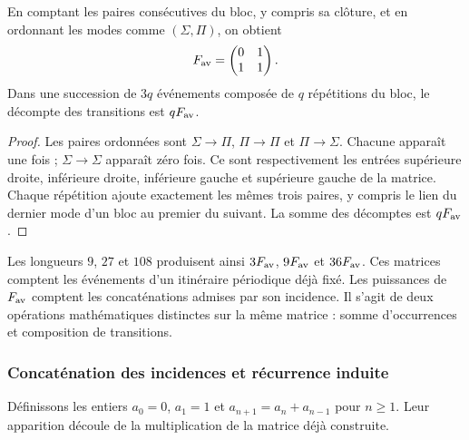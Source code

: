 \begin{proposicion}
\label{prop:cal-incidencia}
En comptant les paires consécutives du bloc, y compris sa clôture, et en ordonnant
les modes comme $(\Sigma,\Pi)$, on obtient
\begin{equation}
 F_{\rm av}=\begin{pmatrix}0&1\\1&1\end{pmatrix}.
 \label{eq:cal-incidencia}
\end{equation}
Dans une succession de $3q$ événements composée de $q$ répétitions du bloc,
le décompte des transitions est $qF_{\rm av}$.
\end{proposicion}
\begin{proof}
Les paires ordonnées sont $\Sigma\to\Pi$, $\Pi\to\Pi$ et
$\Pi\to\Sigma$. Chacune apparaît une fois ; $\Sigma\to\Sigma$
apparaît zéro fois. Ce sont respectivement les entrées supérieure
droite, inférieure droite, inférieure gauche et supérieure gauche de la
matrice. Chaque répétition ajoute exactement les mêmes trois paires, y compris
le lien du dernier mode d’un bloc au premier du suivant.
La somme des décomptes est $qF_{\rm av}$.
\end{proof}

Les longueurs $9$, $27$ et $108$ produisent ainsi $3F_{\rm av}$,
$9F_{\rm av}$ et $36F_{\rm av}$. Ces matrices comptent les événements d’un
itinéraire périodique déjà fixé. Les puissances de $F_{\rm av}$ comptent
les concaténations admises par son incidence. Il s’agit de deux opérations
mathématiques distinctes sur la même matrice : somme d’occurrences et
composition de transitions.

\subsubsection{Concaténation des incidences et récurrence induite}

Définissons les entiers $a_0=0$, $a_1=1$ et
$a_{n+1}=a_n+a_{n-1}$ pour $n\geq1$. Leur apparition découle de la
multiplication de la matrice déjà construite.

